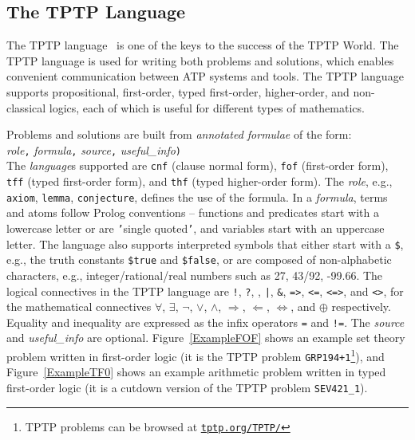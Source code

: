 \documentclass[runningheads]{llncs}
\newcommand{\smalltt}[1]{\small \texttt{#1}}
\begin{document}
\subsection{The TPTP Language}
\label{Languages}

The TPTP language~\cite{Sut23-IGPL} is one of the keys to the success of the TPTP World.
The TPTP language is used for writing both problems and solutions,
which enables convenient communication between ATP systems and tools.
The TPTP language supports propositional, first-order, typed first-order, higher-order, and
non-classical logics, each of which is useful for different types of mathematics.

Problems and solutions are built from {\em annotated formulae} of the form: \\
{\em role}{\tt ,}
{\em formula}{\tt ,}
{\em source}{\tt ,}
{\em useful\_info}{\tt )}\\
The {\em language}s supported are {\smalltt{cnf}} (clause normal form), {\smalltt{fof}}
(first-order form), {\smalltt{tff}} (typed first-order form), and {\smalltt{thf}}
(typed higher-order form).
The {\em role}, e.g., {\smalltt{axiom}}, {\smalltt{lemma}}, {\smalltt{conjecture}}, defines the 
use of the formula.
In a {\em formula}, terms and atoms follow Prolog conventions -- functions and predicates start 
with a lowercase letter or are {\tt '}single quoted{\tt '}, and variables start with an uppercase 
letter.
The language also supports interpreted symbols that either start with a {\tt \$}, e.g., the 
truth constants {\smalltt{\$true}} and {\smalltt{\$false}}, or are composed of 
non-alphabetic characters, e.g., integer/rational/real numbers such as 27, 43/92, -99.66.
The logical connectives in the TPTP language are
{\tt !}, {\tt ?}, {\tt {\raisebox{0.4ex}{\texttildelow}}}, {\tt |}, {\tt \&}, {\tt =>}, {\tt <=},
{\tt <=>}, and {\tt <{\raisebox{0.4ex}{\texttildelow}}>},
for the mathematical connectives
$\forall$, $\exists$, $\neg$, $\vee$, $\wedge$, $\Rightarrow$, $\Leftarrow$, $\Leftrightarrow$, 
and $\oplus$ respectively.
Equality and inequality are expressed as the infix operators {\tt =} and {\tt !=}.
The {\em source} and {\em useful\_info} are optional.
Figure~\ref{ExampleFOF} shows an example set theory problem written in first-order logic
(it is the TPTP problem {\tt GRP194+1}\footnote{%
TPTP problems can be browsed at \href{https://tptp.org/TPTP/}{{\tt tptp.org/TPTP/}}}), and 
Figure~\ref{ExampleTF0} shows an example arithmetic problem written in typed first-order logic 
(it is a cutdown version of the TPTP problem {\tt SEV421\_1}).
\end{document}
